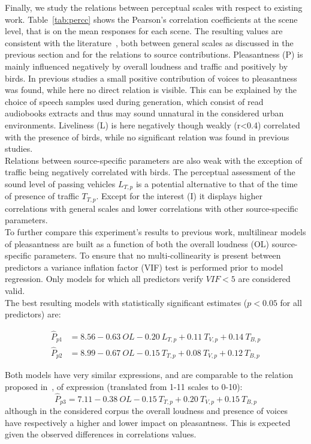 \documentclass[11pt,a4paper]{article}
\begin{document}
Finally, we study the relations between perceptual scales with respect to existing work. Table~\ref{tab:percc} shows the Pearson's correlation coefficients at the scene level, that is on the mean responses for each scene. The resulting values are consistent with the literature~\cite{aumond, lavandier}, both between general scales as discussed in the previous section and for the relations to source contributions. Pleasantness (P) is mainly influenced negatively by overall loudness and traffic and positively by birds. In previous studies a small positive contribution of voices to pleasantness was found, while here no direct relation is visible. This can be explained by the choice of speech samples used during generation, which consist of read audiobooks extracts and thus may sound unnatural in the considered urban environments. Liveliness (L) is here negatively though weakly (r<0.4) correlated with the presence of birds, while no significant relation was found in previous studies.\\

Relations between source-specific parameters are also weak with the exception of traffic being negatively correlated with birds. The perceptual assessment of the sound level of passing vehicles $L_{T, p}$ is a potential alternative to that of the time of presence of traffic $T_{T, p}$. Except for the interest (I) it displays higher correlations with general scales and lower correlations with other source-specific parameters.\\

To further compare this experiment's results to previous work, multilinear models of pleasantness are built as a function of both the overall loudness (OL) source-specific parameters. To ensure that no multi-collinearity is present between predictors a variance inflation factor (VIF) test is performed prior to model regression. Only models for which all predictors verify $VIF<5$ are considered valid.\\

The best resulting models with statistically significant estimates ($p<0.05$ for all predictors) are:

\begin{align}
\hat P_{p1} &= 8.56 - 0.63~OL - 0.20~L_{T, p} + 0.11~T_{V, p} + 0.14~T_{B, p}\\
\hat P_{p2} &= 8.99 - 0.67~OL - 0.15~T_{T, p} + 0.08~T_{V, p} + 0.12~T_{B, p}
\end{align}

Both models have very similar expressions, and are comparable to the relation proposed in~\cite{ricciardi2014}, of expression (translated from 1-11 scales to 0-10):
\begin{equation}
\hat P_{p3} = 7.11 - 0.38~OL - 0.15~T_{T, p} + 0.20~T_{V, p} + 0.15~T_{B, p}
\end{equation}
although in the considered corpus the overall loudness and presence of voices have respectively a higher and lower impact on pleasantness. This is expected given the observed differences in correlations values.\\
\end{document}
